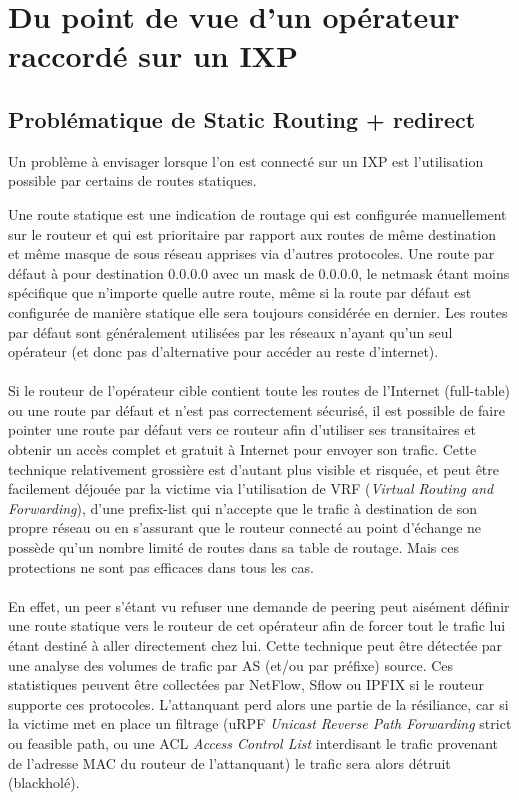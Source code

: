 \section{Du point de vue d'un opérateur raccordé sur un IXP}

\subsection{Problématique de Static Routing + redirect}
Un problème à envisager lorsque l'on est connecté sur un IXP est l’utilisation possible par certains de routes statiques. 

Une route statique est une indication de routage qui est configurée manuellement sur le routeur et qui est prioritaire par rapport aux routes de même destination et même masque de sous réseau apprises via d'autres protocoles.
Une route par défaut à pour destination 0.0.0.0 avec un mask de 0.0.0.0, le netmask étant moins spécifique que n'importe quelle autre route, même si la route par défaut est configurée de manière statique elle sera toujours considérée en dernier. Les routes par défaut sont généralement utilisées par les réseaux n'ayant qu'un seul opérateur (et donc pas d'alternative pour accéder au reste d'internet).

\paragraph{}
Si le routeur de l'opérateur cible contient toute les routes de l'Internet (full-table) ou une route par défaut et n'est pas correctement sécurisé, il est possible de faire pointer une route par défaut vers ce routeur afin d’utiliser ses transitaires et obtenir un accès complet et gratuit à Internet pour envoyer son trafic. Cette technique relativement grossière est d'autant plus visible et risquée, et peut être facilement déjouée par la victime via l'utilisation de VRF (\emph{Virtual Routing and Forwarding}), d'une prefix-list qui n'accepte que le trafic à destination de son propre réseau ou en s'assurant que le routeur connecté au point d'échange ne possède qu'un nombre limité de routes dans sa table de routage. Mais ces protections ne sont pas efficaces dans tous les cas.

\paragraph{}
En effet, un peer s'étant vu refuser une demande de peering peut aisément définir une route statique vers le routeur de cet opérateur afin de forcer tout le trafic lui étant destiné à aller directement chez lui. Cette technique peut être détectée par une analyse des volumes de trafic par AS (et/ou par préfixe) source. Ces statistiques peuvent être collectées par NetFlow, Sflow ou IPFIX si le routeur supporte ces protocoles. L'attanquant perd alors une partie de la résiliance, car si la victime met en place un filtrage (uRPF \emph{Unicast Reverse Path Forwarding} strict ou feasible path, ou une ACL \emph{Access Control List} interdisant le trafic provenant de l'adresse MAC du routeur de l'attanquant) le trafic sera alors détruit (blackholé).

